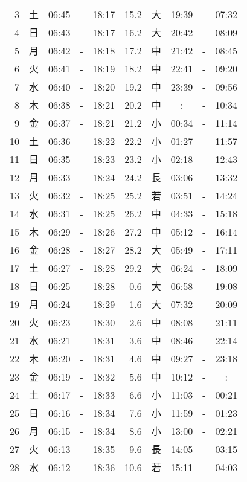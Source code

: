 \documentclass[a4j,10pt]{jsarticle}
\begin{document}
\begin{center}
\begin{table}[ht]
\begin{center}
\begin{tabular}{|rc|ccc|rc|ccc|}
  3 & 土 & 06:45 &-& 18:17 & 15.2 & 大 & 19:39 &-& 07:32 \\
  4 & 日 & 06:43 &-& 18:17 & 16.2 & 大 & 20:42 &-& 08:09 \\
  5 & 月 & 06:42 &-& 18:18 & 17.2 & 中 & 21:42 &-& 08:45 \\
  6 & 火 & 06:41 &-& 18:19 & 18.2 & 中 & 22:41 &-& 09:20 \\
  7 & 水 & 06:40 &-& 18:20 & 19.2 & 中 & 23:39 &-& 09:56 \\
  8 & 木 & 06:38 &-& 18:21 & 20.2 & 中 & --:-- &-& 10:34 \\
  9 & 金 & 06:37 &-& 18:21 & 21.2 & 小 & 00:34 &-& 11:14 \\
 10 & 土 & 06:36 &-& 18:22 & 22.2 & 小 & 01:27 &-& 11:57 \\
 11 & 日 & 06:35 &-& 18:23 & 23.2 & 小 & 02:18 &-& 12:43 \\
 12 & 月 & 06:33 &-& 18:24 & 24.2 & 長 & 03:06 &-& 13:32 \\
 13 & 火 & 06:32 &-& 18:25 & 25.2 & 若 & 03:51 &-& 14:24 \\
 14 & 水 & 06:31 &-& 18:25 & 26.2 & 中 & 04:33 &-& 15:18 \\
 15 & 木 & 06:29 &-& 18:26 & 27.2 & 中 & 05:12 &-& 16:14 \\
 16 & 金 & 06:28 &-& 18:27 & 28.2 & 大 & 05:49 &-& 17:11 \\
 17 & 土 & 06:27 &-& 18:28 & 29.2 & 大 & 06:24 &-& 18:09 \\
 18 & 日 & 06:25 &-& 18:28 &  0.6 & 大 & 06:58 &-& 19:08 \\
 19 & 月 & 06:24 &-& 18:29 &  1.6 & 大 & 07:32 &-& 20:09 \\
 20 & 火 & 06:23 &-& 18:30 &  2.6 & 中 & 08:08 &-& 21:11 \\
 21 & 水 & 06:21 &-& 18:31 &  3.6 & 中 & 08:46 &-& 22:14 \\
 22 & 木 & 06:20 &-& 18:31 &  4.6 & 中 & 09:27 &-& 23:18 \\
 23 & 金 & 06:19 &-& 18:32 &  5.6 & 中 & 10:12 &-& --:-- \\
 24 & 土 & 06:17 &-& 18:33 &  6.6 & 小 & 11:03 &-& 00:21 \\
 25 & 日 & 06:16 &-& 18:34 &  7.6 & 小 & 11:59 &-& 01:23 \\
 26 & 月 & 06:15 &-& 18:34 &  8.6 & 小 & 13:00 &-& 02:21 \\
 27 & 火 & 06:13 &-& 18:35 &  9.6 & 長 & 14:05 &-& 03:15 \\
 28 & 水 & 06:12 &-& 18:36 & 10.6 & 若 & 15:11 &-& 04:03 \\

\end{tabular}
\end{center}
\end{table}
\end{center}
\end{document}
